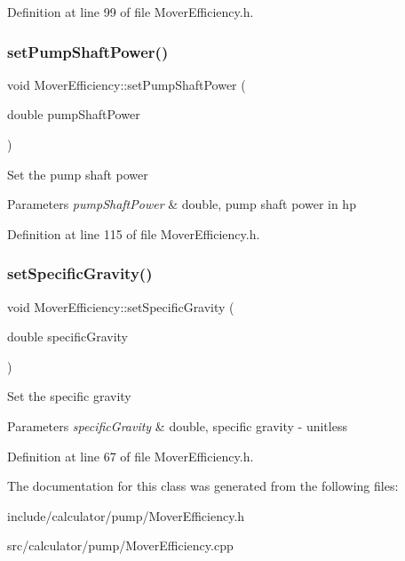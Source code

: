 Definition at line 99 of file Mover\+Efficiency.\+h.

\mbox{\label{class_mover_efficiency_afc2fea6487106318d441a0130ed2934d}} 
\subsubsection{\texorpdfstring{set\+Pump\+Shaft\+Power()}{setPumpShaftPower()}}
{\footnotesize\ttfamily void Mover\+Efficiency\+::set\+Pump\+Shaft\+Power (\begin{DoxyParamCaption}\item[{double}]{pump\+Shaft\+Power }\end{DoxyParamCaption})\hspace{0.3cm}{\ttfamily [inline]}}

Set the pump shaft power 
\begin{DoxyParams}{Parameters}
{\em pump\+Shaft\+Power} & double, pump shaft power in hp \\
\hline
\end{DoxyParams}


Definition at line 115 of file Mover\+Efficiency.\+h.

\mbox{\label{class_mover_efficiency_aed095f525636345bdfebe76774afa2d4}} 
\subsubsection{\texorpdfstring{set\+Specific\+Gravity()}{setSpecificGravity()}}
{\footnotesize\ttfamily void Mover\+Efficiency\+::set\+Specific\+Gravity (\begin{DoxyParamCaption}\item[{double}]{specific\+Gravity }\end{DoxyParamCaption})\hspace{0.3cm}{\ttfamily [inline]}}

Set the specific gravity 
\begin{DoxyParams}{Parameters}
{\em specific\+Gravity} & double, specific gravity -\/ unitless \\
\hline
\end{DoxyParams}


Definition at line 67 of file Mover\+Efficiency.\+h.



The documentation for this class was generated from the following files\+:\begin{DoxyCompactItemize}
\item 
include/calculator/pump/Mover\+Efficiency.\+h\item 
src/calculator/pump/Mover\+Efficiency.\+cpp\end{DoxyCompactItemize}
